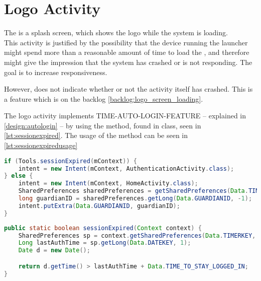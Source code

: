 \section{Logo Activity}
The  is a splash screen, which shows the \giraf[] logo while the system is loading. \\
This activity is justified by the possibility that the device running the launcher might spend more than a reasonable amount of time to load the , and therefore might give the impression that the system has crashed or is not responding. The goal is to increase responsiveness.

However,  does not indicate whether or not the activity itself has crashed. This is a feature which is on the backlog \autoref{backlog:logo_screen_loading}.

The logo activity implements TIME-AUTO-LOGIN-FEATURE -- explained in \autoref{design:autologin} -- by using the  method, found in  class, seen in \autoref{lst:sessionexpired}.
The usage of the  method can be seen in \autoref{lst:sessionexpiredusage}

\begin{lstlisting}[style=sourceCode, language=JAVA, caption=Snippet of: LogoActivity.java, label=lst:sessionexpiredusage] 
if (Tools.sessionExpired(mContext)) {
	intent = new Intent(mContext, AuthenticationActivity.class);
} else {
	intent = new Intent(mContext, HomeActivity.class);
	SharedPreferences sharedPreferences = getSharedPreferences(Data.TIMERKEY, 0);
	long guardianID = sharedPreferences.getLong(Data.GUARDIANID, -1);
	intent.putExtra(Data.GUARDIANID, guardianID);
}

\end{lstlisting}


\begin{lstlisting}[style=sourceCode, language=JAVA, caption=Snippet of: Tools.java, label=lst:sessionexpired]
public static boolean sessionExpired(Context context) {
	SharedPreferences sp = context.getSharedPreferences(Data.TIMERKEY, 0);
	Long lastAuthTime = sp.getLong(Data.DATEKEY, 1);
	Date d = new Date();

	return d.getTime() > lastAuthTime + Data.TIME_TO_STAY_LOGGED_IN;
}
	\end{lstlisting}